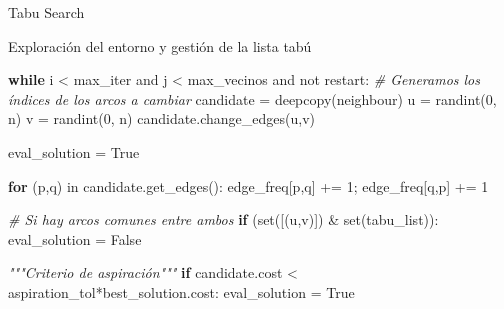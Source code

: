 \documentclass[ignorenonframetext,]{beamer}
\newenvironment{Shaded}{}{}
\newcommand{\KeywordTok}[1]{\textcolor[rgb]{0.00,0.44,0.13}{\textbf{{#1}}}}
\newcommand{\DataTypeTok}[1]{\textcolor[rgb]{0.56,0.13,0.00}{{#1}}}
\newcommand{\DecValTok}[1]{\textcolor[rgb]{0.25,0.63,0.44}{{#1}}}
\newcommand{\CommentTok}[1]{\textcolor[rgb]{0.38,0.63,0.69}{\textit{{#1}}}}
\newcommand{\OtherTok}[1]{\textcolor[rgb]{0.00,0.44,0.13}{{#1}}}
\newcommand{\NormalTok}[1]{{#1}}
\begin{document}
\begin{frame}[fragile]{Tabu Search}

\begin{block}{Exploración del entorno y gestión de la lista tabú}

\begin{Shaded}
\begin{Highlighting}[]
        \KeywordTok{while} \NormalTok{i < max_iter and j < max_vecinos and not restart:  }
            \CommentTok{# Generamos los índices de los arcos a cambiar}
            \NormalTok{candidate = deepcopy(neighbour)    }
            \NormalTok{u = randint(}\DecValTok{0}\NormalTok{, n)}
            \NormalTok{v = randint(}\DecValTok{0}\NormalTok{, n)   }
            \NormalTok{candidate.change_edges(u,v)}

            \NormalTok{eval_solution = }\OtherTok{True}

            \KeywordTok{for} \NormalTok{(p,q) in candidate.get_edges():}
                \NormalTok{edge_freq[p,q] += }\DecValTok{1}\NormalTok{;}
                \NormalTok{edge_freq[q,p] += }\DecValTok{1}

            \CommentTok{# Si hay arcos comunes entre ambos}
            \KeywordTok{if} \NormalTok{(}\DataTypeTok{set}\NormalTok{([(u,v)]) & }\DataTypeTok{set}\NormalTok{(tabu_list)):}
                \NormalTok{eval_solution = }\OtherTok{False}

                \CommentTok{"""Criterio de aspiración"""}
                \KeywordTok{if} \NormalTok{candidate.cost < aspiration_tol*best_solution.cost:}
                    \NormalTok{eval_solution = }\OtherTok{True}
\end{Highlighting}
\end{Shaded}

\end{block}

\end{frame}
\end{document}
